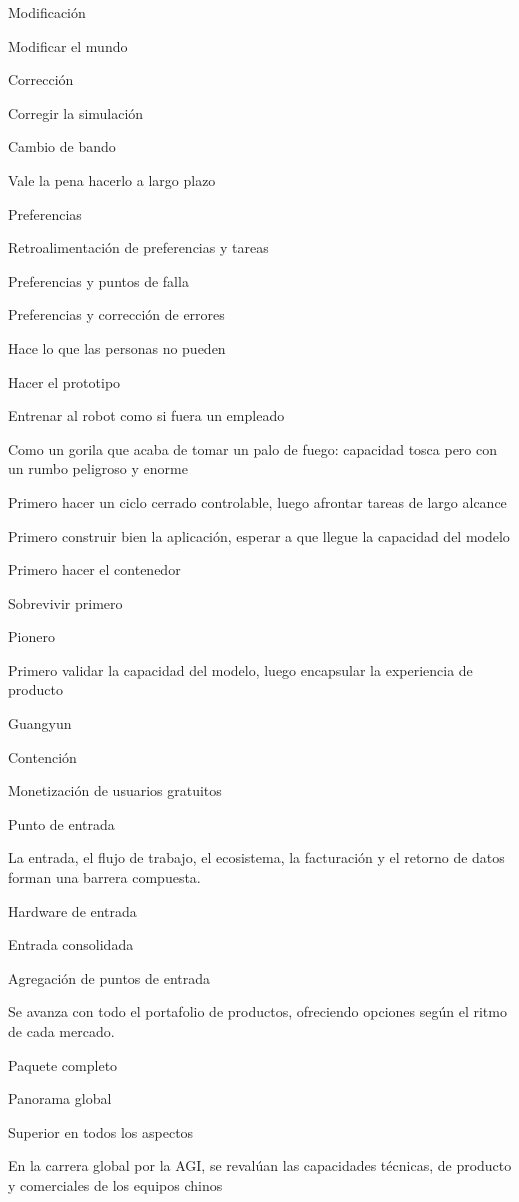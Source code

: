 \documentclass{article}
\begin{document}
Modificación

Modificar el mundo

Corrección

Corregir la simulación

Cambio de bando

Vale la pena hacerlo a largo plazo

Preferencias

Retroalimentación de preferencias y tareas

Preferencias y puntos de falla

Preferencias y corrección de errores

Hace lo que las personas no pueden

Hacer el prototipo

Entrenar al robot como si fuera un empleado

Como un gorila que acaba de tomar un palo de fuego: capacidad tosca pero con un rumbo peligroso y enorme

Primero hacer un ciclo cerrado controlable, luego afrontar tareas de largo alcance

Primero construir bien la aplicación, esperar a que llegue la capacidad del modelo

Primero hacer el contenedor

Sobrevivir primero

Pionero

Primero validar la capacidad del modelo, luego encapsular la experiencia de producto

Guangyun

Contención

Monetización de usuarios gratuitos

Punto de entrada

La entrada, el flujo de trabajo, el ecosistema, la facturación y el retorno de datos forman una barrera compuesta.

Hardware de entrada

Entrada consolidada

Agregación de puntos de entrada

Se avanza con todo el portafolio de productos, ofreciendo opciones según el ritmo de cada mercado.

Paquete completo

Panorama global

Superior en todos los aspectos

En la carrera global por la AGI, se revalúan las capacidades técnicas, de producto y comerciales de los equipos chinos
\end{document}
